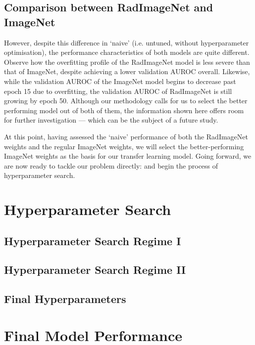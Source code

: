 \subsection{Comparison between RadImageNet and ImageNet}

However, despite this difference in \enquote*{naive} (i.e. untuned, without hyperparameter optimisation), the performance characteristics of both models are quite different. Observe how the overfitting profile of the RadImageNet model is less severe than that of ImageNet, despite achieving a lower validation AUROC overall. Likewise, while the validation AUROC of the ImageNet model begins to decrease past epoch 15 due to overfitting, the validation AUROC of RadImageNet is still growing by epoch 50. Although our methodology calls for us to select the better performing model out of both of them, the information shown here offers room for further investigation --- which can be the subject of a future study.

At this point, having assessed the \enquote*{naive} performance of both the RadImageNet weights and the regular ImageNet weights, we will select the better-performing ImageNet weights as the basis for our transfer learning model. Going forward, we are now ready to tackle our problem directly: and begin the process of hyperparameter search.

\section{Hyperparameter Search}

\subsection{Hyperparameter Search Regime I}









\subsection{Hyperparameter Search Regime II}





\subsection{Final Hyperparameters}

\section{Final Model Performance}
